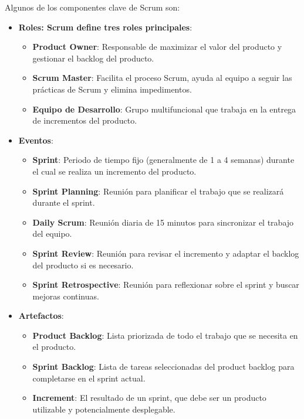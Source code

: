Algunos de los componentes clave de Scrum son:
\begin{itemize}

    \item\textbf{Roles: Scrum define tres roles principales}:
    \begin{itemize}
 
        \item\textbf{Product Owner}: Responsable de maximizar el valor del producto y gestionar el backlog del producto.
        \item\textbf{Scrum Master}: Facilita el proceso Scrum, ayuda al equipo a seguir las prácticas de Scrum y elimina impedimentos.
        \item\textbf{Equipo de Desarrollo}: Grupo multifuncional que trabaja en la entrega de incrementos del producto.
          
    \end{itemize}
    \item\textbf{Eventos}:
    \begin{itemize}

        \item\textbf{Sprint}: Periodo de tiempo fijo (generalmente de 1 a 4 semanas) durante el cual se realiza un incremento del producto.
        \item\textbf{Sprint Planning}: Reunión para planificar el trabajo que se realizará durante el sprint.
        \item\textbf{Daily Scrum}: Reunión diaria de 15 minutos para sincronizar el trabajo del equipo.
        \item\textbf{Sprint Review}: Reunión para revisar el incremento y adaptar el backlog del producto si es necesario.
        \item\textbf{Sprint Retrospective}: Reunión para reflexionar sobre el sprint y buscar mejoras continuas.
           
    \end{itemize}
    \item\textbf{Artefactos}:
    \begin{itemize}

        \item\textbf{Product Backlog}: Lista priorizada de todo el trabajo que se necesita en el producto.
        \item\textbf{Sprint Backlog}: Lista de tareas seleccionadas del product backlog para completarse en el sprint actual.
        \item\textbf{Increment}: El resultado de un sprint, que debe ser un producto utilizable y potencialmente desplegable.
          
    \end{itemize}
   
\end{itemize}

